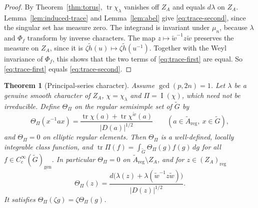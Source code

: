 \documentclass[12pt,letterpaper]{article}
\numberwithin{equation}{section}
\theoremstyle{plain}
\newtheorem{theorem}{Theorem}[section]
\theoremstyle{definition}
\theoremstyle{remark}
\newcommand{\Gt}{\widetilde G}
\newcommand{\At}{\widetilde A}
\newcommand{\hl}{\tilde h}
\newcommand{\wt}{\tilde w}
\newcommand{\ZA}{Z_A}
\newcommand{\gen}{\mathrm{gen}}
\newcommand{\reg}{\mathrm{reg}}
\DeclareMathOperator{\PI}{I}
\DeclareMathOperator{\tr}{tr}
\begin{document}
\begin{proof}
By Theorem~\ref{thm:torus}, $\tr\chi_\lambda$ vanishes off $\ZA$ and
equals $d\lambda$ on $\ZA$. Lemma~\ref{lem:induced-trace} and
Lemma~\ref{lem:abel} give \eqref{eq:trace-second}, since the singular
set has measure zero. The integrand is invariant under $\mu_n$,
because $\lambda$ and $\Phi_f$ transform by inverse characters. The
map $z\mapsto\wt^{-1}z\wt$ preserves the measure on $\ZA$, since it is
$\zeta\hl(u)\mapsto\zeta\hl(u^{-1})$. Together with the Weyl
invariance of $\Phi_f$, this shows that the two terms of
\eqref{eq:trace-first} are equal. So \eqref{eq:trace-first} equals
\eqref{eq:trace-second}.
\end{proof}

\begin{theorem}[Principal-series character]\label{thm:character}
Assume $\gcd(p,2n)=1$. Let $\lambda$ be a genuine smooth character of
$\ZA$, $\chi=\chi_\lambda$ and $\Pi=\PI(\chi)$, which need not be
irreducible. Define $\Theta_\Pi$ on the regular semisimple set of
$\Gt$ by
\begin{equation}\label{eq:char-formula}
\Theta_\Pi(x^{-1}ax)=
\frac{\tr\chi(a)+\tr\chi^{\wt}(a)}{|D(a)|^{1/2}}\qquad
(a\in\At_\reg,\ x\in\Gt),
\end{equation}
and $\Theta_\Pi=0$ on elliptic regular elements. Then $\Theta_\Pi$ is
a well-defined, locally integrable class function, and
$\tr\Pi(f)=\int_{\Gt}\Theta_\Pi(g)f(g)\,dg$ for all
$f\in C_c^\infty(\Gt)_\gen$. In particular $\Theta_\Pi=0$ on
$\At_\reg\setminus\ZA$, and for $z\in(\ZA)_\reg$
\begin{equation}\label{eq:char-Z}
\Theta_\Pi(z)=\frac{d\bigl(\lambda(z)+\lambda(\wt^{-1}z\wt)\bigr)}
{|D(z)|^{1/2}} .
\end{equation}
It satisfies $\Theta_\Pi(\zeta g)=\zeta\Theta_\Pi(g)$.
\end{theorem}
\end{document}
